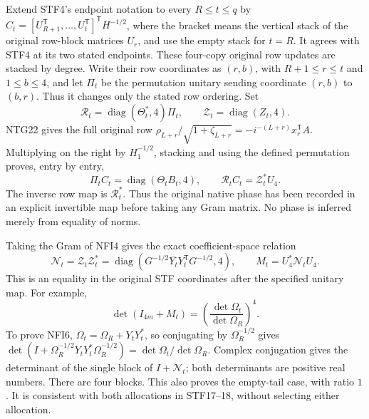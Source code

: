 \documentclass[11pt,a4paper]{article}
\begin{document}
Extend STF4's endpoint notation to every $R\le t\le q$ by
$C_t=[U_{R+1}^{\mathsf T},\ldots,U_t^{\mathsf T}]^{\mathsf T}H^{-1/2}$,
where the bracket means the vertical stack of the original row-block
matrices $U_r$, and use the empty stack for $t=R$.
It agrees with STF4 at its two stated endpoints.
These four-copy original row updates are stacked by degree. Write their
row coordinates as $(r,b)$, with $R+1\le r\le t$ and $1\le b\le4$,
and let $\Pi_t$ be the permutation unitary sending coordinate
$(r,b)$ to $(b,r)$. Thus it changes only the stated row ordering.
Set
\[
 \mathscr R_t=\operatorname{diag}(\Theta_t^*,4)\Pi_t,\qquad
 \mathscr Z_t=\operatorname{diag}(Z_t,4).
                                                               \tag{NFI3}
\]
NTG22 gives the full original row
$\rho_{L+r}/\sqrt{1+\zeta_{L+r}}=-i^{-(L+r)}x_r^{\mathsf T}A$.
Multiplying on the right by $H_1^{-1/2}$, stacking and using the
defined permutation proves, entry by entry,
\[
 \Pi_t C_t=\operatorname{diag}(\Theta_tB_t,4),\qquad
 \boxed{\mathscr R_t C_t=\mathscr Z_t^*U_4.}
                                                               \tag{NFI4}
\]
The inverse row map is $\mathscr R_t^*$. Thus the original native
phase has been recorded in an explicit invertible map before taking
any Gram matrix. No phase is inferred merely from equality of norms.

Taking the Gram of NFI4 gives the exact coefficient-space relation
\[
 \mathscr N_t=\mathscr Z_t\mathscr Z_t^*
       =\operatorname{diag}(G^{-1/2}\overline{Y_t}Y_t^{\mathsf T}
                                      G^{-1/2},4),\qquad
 M_t=U_4^*\mathscr N_tU_4.
                                                               \tag{NFI5}
\]
This is an equality in the original STF coordinates after the
specified unitary map. For example,
\[
 \det(I_{4m}+M_t)
       =\left(\frac{\det\Omega_t}{\det\Omega_R}\right)^4.
                                                               \tag{NFI6}
\]
To prove NFI6, $\Omega_t=\Omega_R+Y_tY_t^*$, so conjugating
by $\Omega_R^{-1/2}$ gives
$\det(I+\Omega_R^{-1/2}Y_tY_t^*\Omega_R^{-1/2})
=\det\Omega_t/\det\Omega_R$.
Complex conjugation gives the determinant of the single block of
$I+\mathscr N_t$; both determinants are positive real numbers.
There are four blocks. This also proves the empty-tail case, with
ratio $1$. It is consistent with both allocations in STF17--18,
without selecting either allocation.
\end{document}
